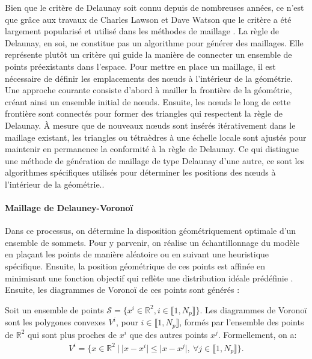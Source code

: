 Bien que le critère de Delaunay soit connu depuis de nombreuses années, ce n'est que grâce aux travaux de Charles Lawson et Dave Watson que le critère a été largement popularisé et utilisé dans les méthodes de maillage \cite{owen1998survey}. La règle de Delaunay, en soi, ne constitue pas un algorithme pour générer des maillages. Elle représente plutôt un critère qui guide la manière de connecter un ensemble de points préexistants dans l'espace. Pour mettre en place un maillage, il est nécessaire de définir les emplacements des nœuds à l'intérieur de la géométrie. Une approche courante consiste d'abord à mailler la frontière de la géométrie, créant ainsi un ensemble initial de nœuds. Ensuite, les nœuds le long de cette frontière sont connectés pour former des triangles qui respectent la règle de Delaunay. À mesure que de nouveaux nœuds sont insérés itérativement dans le maillage existant, les triangles ou tétraèdres à une échelle locale sont ajustés pour maintenir en permanence la conformité à la règle de Delaunay. Ce qui distingue une méthode de génération de maillage de type Delaunay d'une autre, ce sont les algorithmes spécifiques utilisés pour déterminer les positions des nœuds à l'intérieur de la géométrie.\cite{owen1998survey}.

\paragraph{Maillage de Delauney-Voronoï}
Dans ce processus, on détermine la disposition géométriquement optimale d'un ensemble de sommets. Pour y parvenir, on réalise un échantillonnage du modèle en plaçant les points de manière aléatoire ou en suivant une heuristique spécifique. Ensuite, la position géométrique de ces points est affinée en minimisant une fonction objectif qui reflète une distribution idéale prédéfinie \cite{botella2016generation}. Ensuite, les diagrammes de Voronoï de ces points sont générés :

\begin{definition}
Soit un ensemble de points $\mathcal{S}=\{x^i\in\mathbb{R}^2, i\in\llbracket 1, N_p\rrbracket\}$. Les diagrammes de Voronoï sont les polygones convexes $V^i$, pour $i\in\llbracket 1, N_p\rrbracket$, formés par l’ensemble des points de $\mathbb{R}^2$ qui sont plus proches de $x^i$ que des autres points $x^j$. Formellement, on a:
\begin{eqnarray}
V^i=\{x\in\mathbb{R}^2\ |\ |x-x^i|\leq|x-x^j|,\ \forall j\in\llbracket 1, N_p\rrbracket\}.
\end{eqnarray}
\end{definition}

